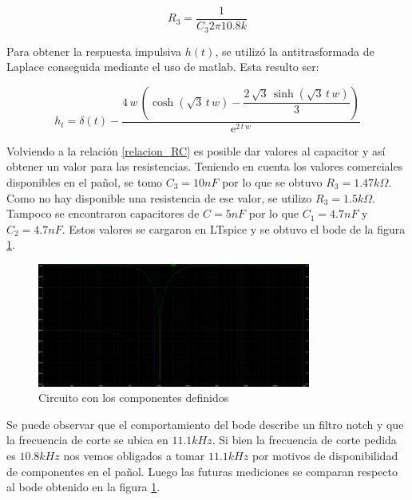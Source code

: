 \documentclass[12pt,a4paper]{article}
\begin{document}
\begin{equation} R_{3} = \frac{1}{C_{3} 2\pi 10.8k} \label{relacion_RC}\end{equation}

Para obtener la respuesta impulsiva $h(t)$, se utilizó la antitrasformada de Laplace conseguida mediante el uso de matlab. Esta resulto ser: 

\begin{equation} h_{t} = \delta\!\left(t\right) - \dfrac{4\, w\, \left(\cosh\!\left(\sqrt{3}\, t\, w\right) - \dfrac{2\, \sqrt{3}\, \sinh\!\left(\sqrt{3}\, t\, w\right)}{3}\right)}{\mathrm{e}^{2\, t\, w}}
  \end{equation}


Volviendo a la relación \ref{relacion_RC} es posible dar valores al capacitor y así obtener un valor para las resistencias. Teniendo en cuenta
los valores comerciales disponibles en el pañol, se tomo $C_{3} = 10nF$ por lo que se obtuvo $R_{3}=1.47k\Omega$. Como
no hay disponible una resistencia de ese valor, se utilizo $R_{3}=1.5k\Omega$. Tampoco se encontraron capacitores de $C = 5nF$ 
por lo que $C_{1} = 4.7nF$ y  $C_{2} = 4.7nF$. Estos valores se cargaron en LTspice y se obtuvo el bode de la 
figura \ref{fig:bode_ltspice_teorico}.

\begin{figure}[ht]                                                       
    \centering\includegraphics[width=0.8\textwidth]{bode_ltspice_teorico.png}
    \caption{Circuito con los componentes definidos}
    \label{fig:bode_ltspice_teorico}
    \end{figure}

Se puede observar que el comportamiento del bode describe un filtro notch y que la frecuencia de corte se ubica en $11.1kHz$. Si
bien la frecuencia de corte pedida es $10.8kHz$ nos vemos obligados a tomar $11.1kHz$ por motivos de disponibilidad de componentes
en el pañol. Luego las futuras mediciones se comparan respecto al bode obtenido en la figura \ref{fig:bode_ltspice_teorico}. \\
\end{document}
